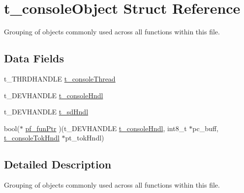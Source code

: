 \hypertarget{structt__console_object}{\section{t\-\_\-console\-Object Struct Reference}
\label{structt__console_object}
}


Grouping of objects commonly used across all functions within this file.  


\subsection*{Data Fields}
\begin{DoxyCompactItemize}
\item 
t\-\_\-\-T\-H\-R\-D\-H\-A\-N\-D\-L\-E \hyperlink{structt__console_object_ae0eceac7658ed204c517d618961e5cd9}{t\-\_\-console\-Thread}
\item 
t\-\_\-\-D\-E\-V\-H\-A\-N\-D\-L\-E \hyperlink{structt__console_object_a6f9d3d1fa28b532e16089830ab73c3b6}{t\-\_\-console\-Hndl}
\item 
t\-\_\-\-D\-E\-V\-H\-A\-N\-D\-L\-E \hyperlink{structt__console_object_aaabb9b990f986cd929e22cd0da9586f1}{t\-\_\-sd\-Hndl}
\item 
bool($\ast$ \hyperlink{structt__console_object_a43c5369489e99b24653bd0b0ff0e77e0}{pf\-\_\-fun\-Ptr} )(t\-\_\-\-D\-E\-V\-H\-A\-N\-D\-L\-E \hyperlink{structt__console_object_a6f9d3d1fa28b532e16089830ab73c3b6}{t\-\_\-console\-Hndl}, int8\-\_\-t $\ast$pc\-\_\-buff, \hyperlink{structt__console_tok_hndl}{t\-\_\-console\-Tok\-Hndl} $\ast$pt\-\_\-tok\-Hndl)
\end{DoxyCompactItemize}


\subsection{Detailed Description}
Grouping of objects commonly used across all functions within this file. 

